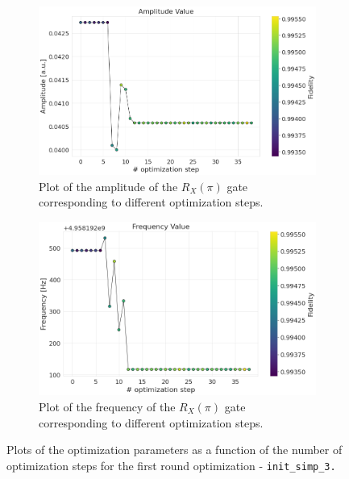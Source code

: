\begin{figure}[h!]
    \centering
    \begin{subfigure}[t]{0.495\textwidth}
        \includegraphics[width=\textwidth]{figures/png/RB_optimization/NM/InitialSymplex/20241113_200745/Amplitude.png}
        \caption{Plot of the amplitude of the $R_X(\pi)$ gate corresponding to different optimization steps.}
        \label{fig:20241113_200745:amplitude}
    \end{subfigure}
    \hfill
    \begin{subfigure}[t]{0.495\textwidth}
        \includegraphics[width=\textwidth]{figures/png/RB_optimization/NM/InitialSymplex/20241113_200745/Frequency.png}
        \caption{Plot of the frequency of the $R_X(\pi)$ gate corresponding to different optimization steps.}
        \label{fig:20241113_200745:frequency}
    \end{subfigure}
    \caption{Plots of the optimization parameters as a function of the number of optimization steps for the first round optimization - \tt{init\_simp\_3}.}
    \label{fig:20241113_200745:parameters}
\end{figure}

